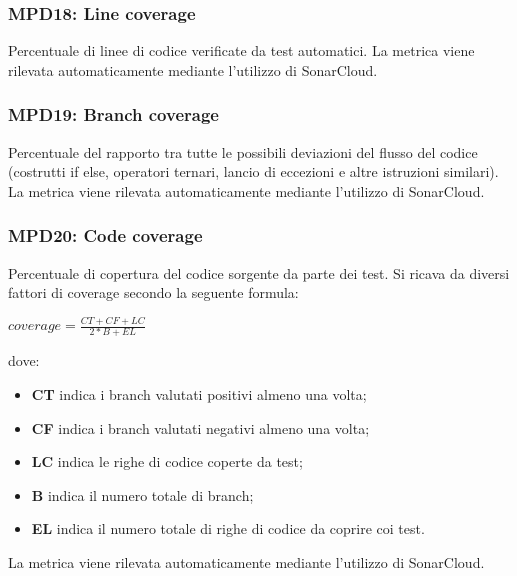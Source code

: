 \subsubsection{MPD18: Line coverage}
Percentuale di linee di codice verificate da test automatici.
La metrica viene rilevata automaticamente mediante l’utilizzo di {SonarCloud}\glo.

\subsubsection{MPD19: Branch coverage}
Percentuale del rapporto tra tutte le possibili deviazioni del flusso del codice (costrutti if else, operatori ternari, lancio di eccezioni e altre istruzioni similari).
La metrica viene rilevata automaticamente mediante l’utilizzo di {SonarCloud}\glo.

\subsubsection{MPD20: Code coverage}
Percentuale di copertura del codice sorgente da parte dei test. Si ricava da diversi fattori di coverage secondo la seguente formula:
\begin{center}
    $coverage = \displaystyle \frac{CT + CF + LC}{2 * B + EL}$
\end{center}
dove:
\begin{itemize}
    \item \textbf{CT} indica i branch valutati positivi almeno una volta;
    \item \textbf{CF} indica i branch valutati negativi almeno una volta;
    \item \textbf{LC} indica le righe di codice coperte da test;
    \item \textbf{B} indica il numero totale di branch;
    \item \textbf{EL} indica il numero totale di righe di codice da coprire coi test.
\end{itemize}
La metrica viene rilevata automaticamente mediante l’utilizzo di {SonarCloud}\glo.
